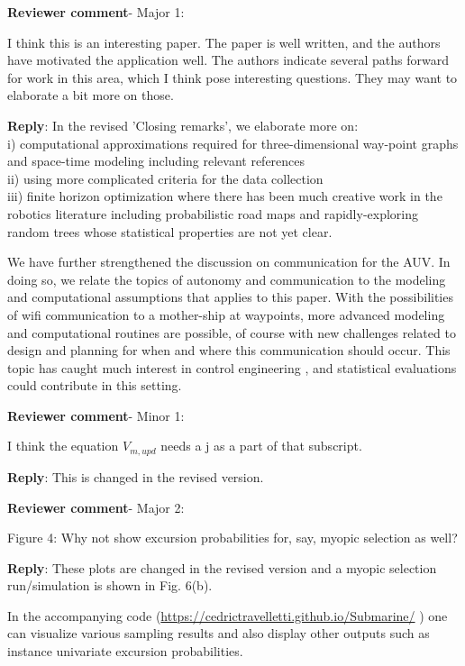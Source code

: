 \documentclass[a4paper]{article}
\def\revcom{\textbf{Reviewer comment}}
\def\reply{\textbf{Reply}}
\begin{document}
\begin{answers}

\item{\revcom - Major 1:}\label{r3c1}

I think this is an interesting paper. The paper is well written, 
and the authors have motivated the application well. 
The authors indicate several paths forward for work in this area, which I think pose interesting questions. They may want to elaborate a bit more on those.

\reply: In the revised 'Closing remarks', we elaborate more on: \\
i) computational approximations required for three-dimensional way-point graphs and space-time modeling including relevant references \citep{sigrist2015stochastic,richardson2017sparsity} \\ 
ii) using more complicated criteria for the data collection \\
iii)
finite horizon optimization where there has been much creative work in the robotics literature including probabilistic road maps and rapidly-exploring random trees \citep{karaman2011sampling} whose statistical properties are not yet clear.

We have further strengthened the discussion on communication for the AUV. In doing so, we relate the topics of autonomy and communication to the modeling and computational assumptions that applies to this paper. With the possibilities of wifi communication to a mother-ship at waypoints, more advanced modeling and computational routines are possible, of course with new challenges related to design and planning for when and where this communication should occur. This topic has caught much interest in control engineering \citep{zolich2019survey}, and statistical evaluations could contribute in this setting.

\item{\revcom - Minor 1:}\label{r3c2}

I think the equation $V_{m,upd}$ needs a j as a part of that subscript.

\reply: This is changed in the revised version.

\item{\revcom - Major 2:}\label{r3c3}

Figure 4: Why not show excursion probabilities for, say, myopic selection as well?

\reply: These plots are changed in the revised version and a myopic selection run/simulation is shown in Fig. 6(b).  

In the accompanying code (\url{https://cedrictravelletti.github.io/Submarine/} )
one can visualize various sampling results and also display other outputs such as instance univariate excursion probabilities.

\end{answers}


\footnotesize



\end{document}
